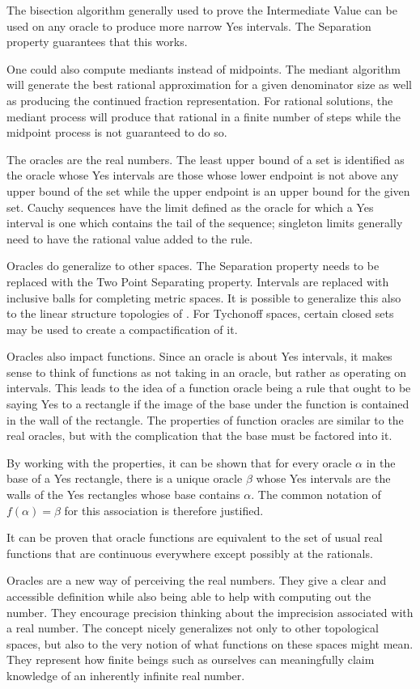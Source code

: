 \documentclass[12pt]{article}
\begin{document}
The bisection algorithm generally used to prove the Intermediate Value can be used on any oracle to produce more narrow Yes intervals. The Separation property guarantees that this works. 

One could also compute mediants instead of midpoints. The mediant algorithm will generate the best rational approximation for a given denominator size as well as producing the continued fraction representation. For rational solutions, the mediant process will produce that rational in a finite number of steps while the midpoint process is not guaranteed to do so. 

The oracles are the real numbers. The least upper bound of a set is identified as the oracle whose Yes intervals are those whose lower endpoint is not above any upper bound of the set while the upper endpoint is an upper bound for the given set. Cauchy sequences have the limit defined as the oracle for which a Yes interval is one which contains the tail of the sequence; singleton limits generally need to have the rational value added to the rule. 

Oracles do generalize to other spaces. The Separation property needs to be replaced with the Two Point Separating property. Intervals are replaced with inclusive balls for completing metric spaces. It is possible to generalize this also to the linear structure topologies of \cite{maudlin}. For Tychonoff spaces, certain closed sets may be used to create a compactification of it. 

Oracles also impact functions. Since an oracle is about Yes intervals, it makes sense to think of functions as not taking in an oracle, but rather as operating on intervals. This leads to the idea of a function oracle being a rule that ought to be saying Yes to a rectangle if the image of the base under the function is contained in the wall of the rectangle. The properties of function oracles are similar to the real oracles, but with the complication that the base must be factored into it. 

By working with the properties, it can be shown that for every oracle $\alpha$ in the base of a Yes rectangle, there is a unique oracle $\beta$ whose Yes intervals are the walls of the Yes rectangles whose base contains $\alpha$. The common notation of $f(\alpha) = \beta$ for this association is therefore justified. 

It can be proven that oracle functions are equivalent to the set of usual real functions that are continuous everywhere except possibly at the rationals. 

Oracles are a new way of perceiving the real numbers. They give a clear and accessible definition while also being able to help with computing out the number. They encourage precision thinking about the imprecision associated with a real number. The concept nicely generalizes not only to other topological spaces, but also to the very notion of what functions on these spaces might mean. They represent how finite beings such as ourselves can meaningfully claim knowledge of an inherently infinite real number. 


\medskip

\normalem %
\printbibliography
\end{document}
